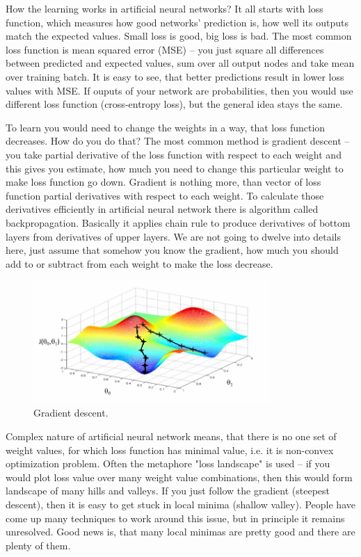 \documentclass[a4paper,11pt]{article}
\begin{document}
How the learning works in artificial neural networks? It all starts with loss function, which measures how good networks' prediction is, how well its outputs match the expected values. Small loss is good, big loss is bad. The most common loss function is mean squared error (MSE) -- you just square all differences between predicted and expected values, sum over all output nodes and take mean over training batch. It is easy to see, that better predictions result in lower loss values with MSE. If ouputs of your network are probabilities, then you would use different loss function (cross-entropy loss), but the general idea stays the same.

To learn you would need to change the weights in a way, that loss function decreases. How do you do that? The most common method is gradient descent -- you take partial derivative of the loss function with respect to each weight and this gives you estimate, how much you need to change this particular weight to make loss function go down. Gradient is nothing more, than vector of loss function partial derivatives with respect to each weight. To calculate those derivatives efficiently in artificial neural network there is algorithm called backpropagation. Basically it applies chain rule to produce derivatives of bottom layers from derivatives of upper layers. We are not going to dwelve into details here, just assume that somehow you know the gradient, how much you should add to or subtract from each weight to make the loss decrease.

\begin{figure}[h]
	\centering
	\includegraphics[width=0.8\textwidth]{gradient_descent.png}
	\caption{Gradient descent.}
	\label{gradient_descent}
%
%
\end{figure}

Complex nature of artificial neural network means, that there is no one set of weight values, for which loss function has minimal value, i.e. it is non-convex optimization problem. Often the metaphore "loss landscape" is used -- if you would plot loss value over many weight value combinations, then this would form landscape of many hills and valleys. If you just follow the gradient (steepest descent), then it is easy to get stuck in local minima (shallow valley). People have come up many techniques to work around this issue, but in principle it remains unresolved. Good news is, that many local minimas are pretty good and there are plenty of them.
\end{document}
